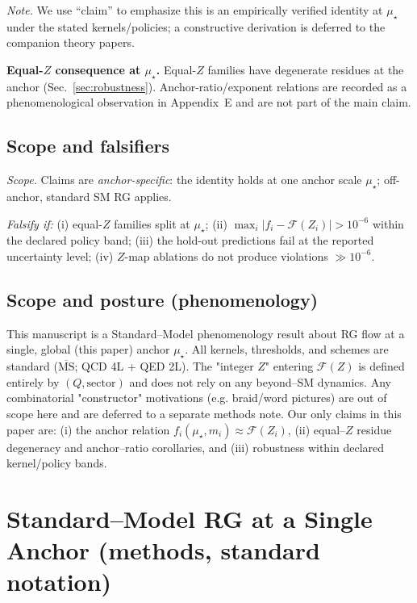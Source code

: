 \documentclass[epjc3]{svjour3}
\begin{document}
\noindent\emph{Note.} We use “claim” to emphasize this is an empirically verified identity at $\mu_\star$ under the stated kernels/policies; a constructive derivation is deferred to the companion theory papers.

\medskip
\noindent\textbf{Equal-$Z$ consequence at $\mu_\star$.} Equal-$Z$ families have degenerate residues at the anchor (Sec.~\ref{sec:robustness}). Anchor-ratio/exponent relations are recorded as a phenomenological observation in Appendix~E and are not part of the main claim.

\subsection{Scope and falsifiers}
\emph{Scope.} Claims are \emph{anchor-specific}: the identity holds at one anchor scale $\mu_\star$; off-anchor, standard SM RG applies.

\emph{Falsify if:} (i) equal-$Z$ families split at $\mu_\star$; (ii) $\max_i\lvert f_i-\mathcal F(Z_i)\rvert>10^{-6}$ within the declared policy band; (iii) the hold-out predictions fail at the reported uncertainty level; (iv) $Z$-map ablations do not produce violations $\gg 10^{-6}$.

\subsection*{Scope and posture (phenomenology)}
This manuscript is a Standard--Model phenomenology result about RG flow at a single, global (this paper) anchor $\mu_\star$. All kernels, thresholds, and schemes are standard ($\overline{\mathrm{MS}}$; QCD 4L + QED 2L). The "integer $Z$" entering $\mathcal F(Z)$ is defined entirely by $(Q,\text{sector})$ and does not rely on any beyond--SM dynamics. Any combinatorial "constructor" motivations (e.g. braid/word pictures) are out of scope here and are deferred to a separate methods note. Our only claims in this paper are: (i) the anchor relation $f_i(\mu_\star,m_i) \approx \mathcal F(Z_i)$, (ii) equal--$Z$ residue degeneracy and anchor--ratio corollaries, and (iii) robustness within declared kernel/policy bands.

\section{Standard--Model RG at a Single Anchor (methods, standard notation)}
\label{sec:smrg-anchor}
\end{document}
